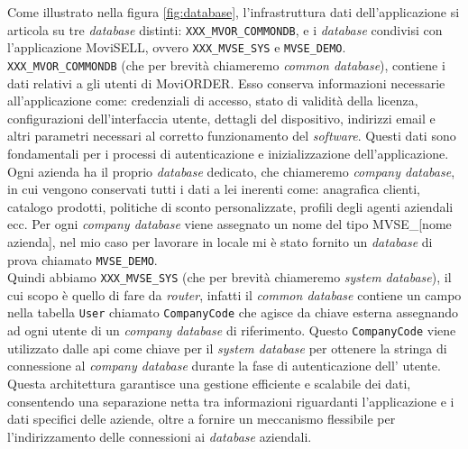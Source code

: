 Come illustrato nella figura \ref{fig:database}, l'infrastruttura dati dell'applicazione {\movi} si articola su tre 
\textit{database} distinti: \texttt{XXX\_MVOR\_COMMONDB}, e i \textit{database} condivisi con l'applicazione 
MoviSELL, ovvero \texttt{XXX\_MVSE\_SYS} e \texttt{MVSE\_DEMO}.\\
\texttt{XXX\_MVOR\_COMMONDB} (che per brevità chiameremo \textit{common database}), contiene i dati relativi a gli utenti di MoviORDER. 
Esso conserva informazioni necessarie all'applicazione come: credenziali di accesso, stato di validità della licenza, 
configurazioni dell'interfaccia utente, dettagli del dispositivo, indirizzi email e altri parametri necessari al corretto 
funzionamento del \textit{software}. Questi dati sono fondamentali per i processi di autenticazione e inizializzazione 
dell'applicazione.\\
Ogni azienda ha il proprio \textit{database} dedicato, che chiameremo \textit{company database}, in cui vengono conservati tutti i dati 
a lei inerenti come: anagrafica clienti, catalogo prodotti, politiche di sconto personalizzate, profili degli agenti 
aziendali ecc. Per ogni \textit{company database} viene assegnato un nome del tipo MVSE\_[nome azienda], nel mio caso per lavorare 
in locale mi è stato fornito un \textit{database} di prova chiamato \texttt{MVSE\_DEMO}.\\
Quindi abbiamo \texttt{XXX\_MVSE\_SYS} (che per brevità chiameremo \textit{system database}), il cui scopo è quello di fare da 
\textit{router}, infatti il \textit{common database} contiene un campo nella tabella \texttt{User} chiamato 
\texttt{CompanyCode} che agisce da chiave esterna assegnando ad ogni utente di {\movi} 
un \textit{company database} di riferimento. Questo \texttt{CompanyCode} viene utilizzato dalle \gls{api} come chiave per il 
\textit{system database} per ottenere la stringa di connessione al \textit{company database} durante la fase di autenticazione dell'
utente.\\
Questa architettura garantisce una gestione efficiente e scalabile dei dati, consentendo una separazione netta tra informazioni 
riguardanti l'applicazione e i dati specifici delle aziende, oltre a fornire un meccanismo flessibile per l'indirizzamento 
delle connessioni ai \textit{database} aziendali.